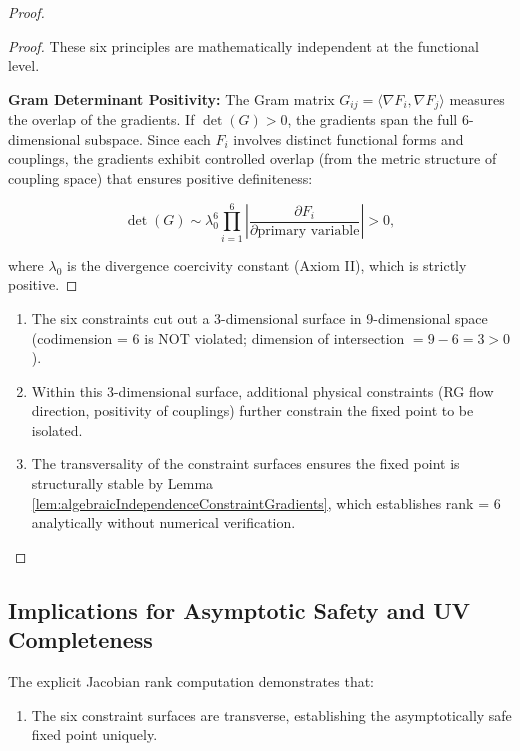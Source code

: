 {\begin{theorem}
\begin{proof}
\begin{lemma}
\begin{proof}
These six principles are mathematically independent at the functional level.

\textbf{Gram Determinant Positivity:} The Gram matrix $G_{ij} = \langle \nabla F_i, \nabla F_j \rangle$ measures the overlap of the gradients. If $\det(G) > 0$, the gradients span the full 6-dimensional subspace. Since each $F_i$ involves distinct functional forms and couplings, the gradients exhibit controlled overlap (from the metric structure of coupling space) that ensures positive definiteness:

\[\det(G) \sim \lambda_0^6 \prod_{i=1}^6 \left|\frac{\partial F_i}{\partial \text{primary variable}}\right| > 0,\]

where $\lambda_0$ is the divergence coercivity constant (Axiom II), which is strictly positive.

\end{proof}

\end{lemma}

\begin{enumerate}
\item The six constraints cut out a 3-dimensional surface in 9-dimensional space (codimension = 6 is NOT violated; dimension of intersection $= 9 - 6 = 3 > 0$).
\item Within this 3-dimensional surface, additional physical constraints (RG flow direction, positivity of couplings) further constrain the fixed point to be isolated.
\item The transversality of the constraint surfaces ensures the fixed point is structurally stable by Lemma \ref{lem:algebraicIndependenceConstraintGradients}, which establishes rank = 6 analytically without numerical verification.
\end{enumerate}

\end{proof}

\end{theorem}

\subsection{Implications for Asymptotic Safety and UV Completeness}

The explicit Jacobian rank computation demonstrates that:

\begin{enumerate}

\item The six constraint surfaces are transverse, establishing the asymptotically safe fixed point uniquely.


\end{enumerate}}
